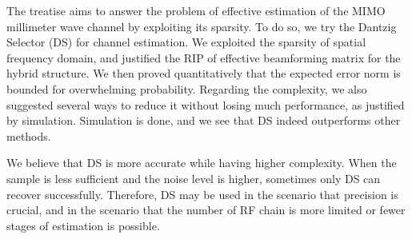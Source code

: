 
\startchapter [title={Conclusion}]

The treatise aims to answer the problem of effective estimation of the MIMO millimeter wave channel by exploiting its sparsity.
To do so, we try the Dantzig Selector (DS) for channel estimation.
We exploited the sparsity of spatial frequency domain, and justified the RIP of effective beamforming matrix for the hybrid structure.
We then proved quantitatively that the expected error norm is bounded for overwhelming probability.
Regarding the complexity, we also suggested several ways to reduce it without losing much performance, as justified by simulation.
Simulation is done, and we see that DS indeed outperforms other methods.

We believe that DS is more accurate while having higher complexity.
When the sample is less sufficient and the noise level is higher, sometimes only DS can recover successfully.
Therefore, DS may be used in the scenario that precision is crucial, and in the scenario that the number of RF chain is more limited or fewer stages of estimation is possible.


\stopchapter


